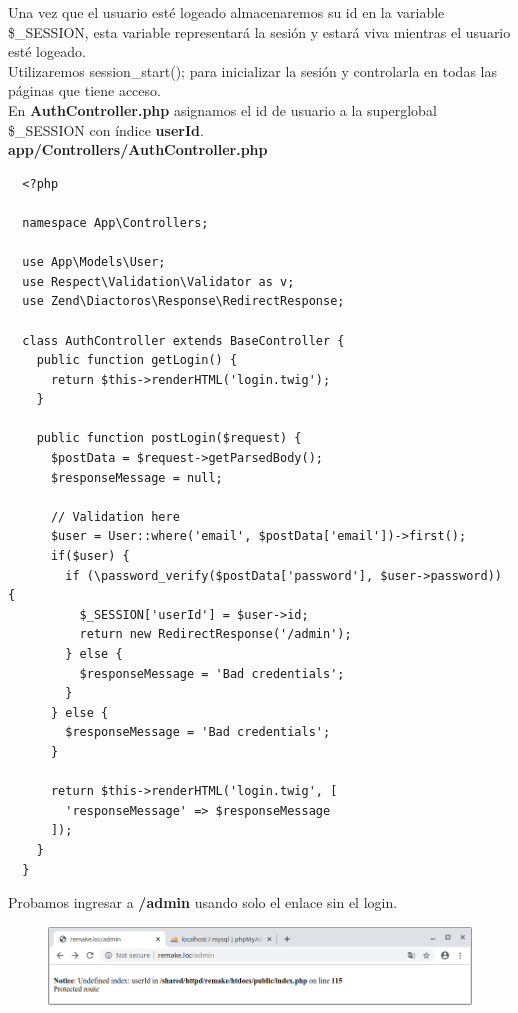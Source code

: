 \documentclass{article}
\begin{document}
Una vez que el usuario esté logeado almacenaremos su id en la variable
\$\_SESSION, esta variable representará la sesión y estará viva mientras el
usuario esté logeado.\\

Utilizaremos session\_start(); para inicializar la sesión y controlarla en todas
las páginas que tiene acceso.\\


En \textbf{AuthController.php} asignamos el id de usuario a la superglobal
\$\_SESSION con índice \textbf{userId}.\\

\textbf{app/Controllers/AuthController.php}
\begin{verbatim}
  <?php

  namespace App\Controllers;

  use App\Models\User;
  use Respect\Validation\Validator as v;
  use Zend\Diactoros\Response\RedirectResponse;

  class AuthController extends BaseController {
    public function getLogin() {
      return $this->renderHTML('login.twig');
    }

    public function postLogin($request) {
      $postData = $request->getParsedBody();
      $responseMessage = null;

      // Validation here
      $user = User::where('email', $postData['email'])->first();
      if($user) {
        if (\password_verify($postData['password'], $user->password)) {
          $_SESSION['userId'] = $user->id;
          return new RedirectResponse('/admin');
        } else {
          $responseMessage = 'Bad credentials';
        }
      } else {
        $responseMessage = 'Bad credentials';
      }

      return $this->renderHTML('login.twig', [
        'responseMessage' => $responseMessage
      ]);
    }
  }
\end{verbatim}

Probamos ingresar a \textbf{/admin} usando solo el enlace sin el login.

\begin{figure}[h!]
  \centering
  \includegraphics[scale=0.5]{./Pictures/213_admin_auth.png}
\end{figure}
\end{document}
